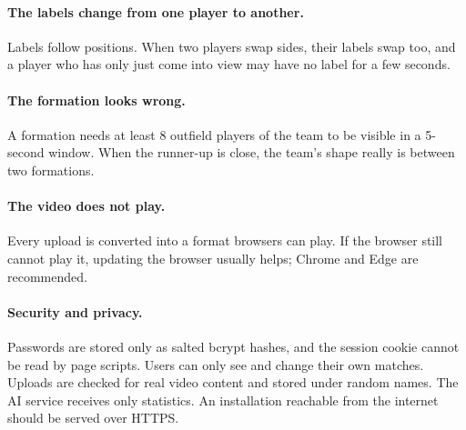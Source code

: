 \paragraph{The labels change from one player to another.} Labels follow positions. When two players swap sides, their labels swap too, and a player who has only just come into view may have no label for a few seconds.

\paragraph{The formation looks wrong.} A formation needs at least 8 outfield players of the team to be visible in a 5-second window. When the runner-up is close, the team's shape really is between two formations.

\paragraph{The video does not play.} Every upload is converted into a format browsers can play. If the browser still cannot play it, updating the browser usually helps; Chrome and Edge are recommended.

\paragraph{Security and privacy.} Passwords are stored only as salted bcrypt hashes, and the session cookie cannot be read by page scripts. Users can only see and change their own matches. Uploads are checked for real video content and stored under random names. The AI service receives only statistics. An installation reachable from the internet should be served over HTTPS.
